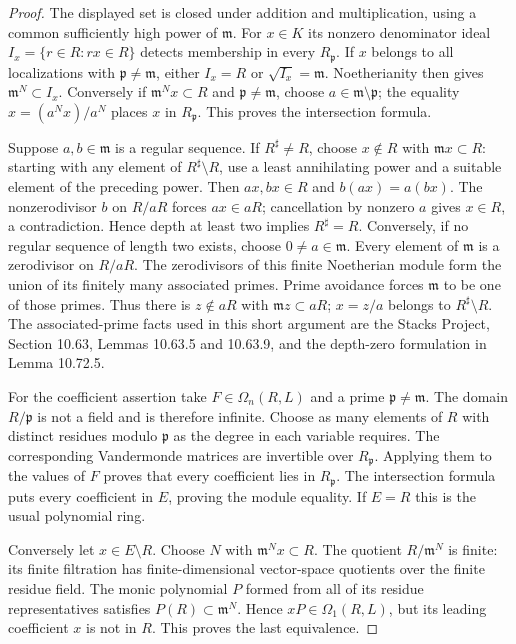 \documentclass[11pt,a4paper]{article}
\theoremstyle{definition}
\begin{document}
\begin{proof}
The displayed set is closed under addition and multiplication,
using a common sufficiently high power of $\mathfrak m$.
For $x\in K$ its nonzero denominator ideal
$I_x=\{r\in R:rx\in R\}$ detects membership in every
$R_{\mathfrak p}$. If $x$ belongs to all localizations with
$\mathfrak p\ne\mathfrak m$, either $I_x=R$ or
$\sqrt{I_x}=\mathfrak m$. Noetherianity then gives
$\mathfrak m^N\subset I_x$. Conversely if
$\mathfrak m^Nx\subset R$ and $\mathfrak p\ne\mathfrak m$,
choose $a\in\mathfrak m\setminus\mathfrak p$; the equality
$x=(a^Nx)/a^N$ places $x$ in $R_{\mathfrak p}$.
This proves the intersection formula.

Suppose $a,b\in\mathfrak m$ is a regular sequence. If
$R^\sharp\ne R$, choose $x\notin R$ with
$\mathfrak m x\subset R$: starting with any element of
$R^\sharp\setminus R$, use a least annihilating power and a
suitable element of the preceding power. Then $ax,bx\in R$ and
$b(ax)=a(bx)$. The nonzerodivisor $b$ on $R/aR$ forces
$ax\in aR$; cancellation by nonzero $a$ gives $x\in R$,
a contradiction. Hence depth at least two implies $R^\sharp=R$.
Conversely, if no regular sequence of length two exists, choose
$0\ne a\in\mathfrak m$. Every element of $\mathfrak m$ is a
zerodivisor on $R/aR$. The zerodivisors of this finite Noetherian
module form the union of its finitely many associated primes.
Prime avoidance forces $\mathfrak m$ to be one of those primes.
Thus there is $z\notin aR$ with $\mathfrak m z\subset aR$;
$x=z/a$ belongs to $R^\sharp\setminus R$.
The associated-prime facts used in this short argument are the
Stacks Project, Section 10.63, Lemmas 10.63.5 and 10.63.9,
and the depth-zero formulation in Lemma 10.72.5.

For the coefficient assertion take $F\in\Omega_n(R,L)$ and a
prime $\mathfrak p\ne\mathfrak m$. The domain $R/\mathfrak p$
is not a field and is therefore infinite. Choose as many elements
of $R$ with distinct residues modulo $\mathfrak p$ as the degree
in each variable requires. The corresponding Vandermonde
matrices are invertible over $R_{\mathfrak p}$. Applying them
to the values of $F$ proves that every coefficient lies in
$R_{\mathfrak p}$. The intersection formula puts every coefficient
in $E$, proving the module equality. If $E=R$ this is the usual
polynomial ring.

Conversely let $x\in E\setminus R$. Choose $N$ with
$\mathfrak m^Nx\subset R$. The quotient $R/\mathfrak m^N$ is
finite: its finite filtration has finite-dimensional vector-space
quotients over the finite residue field. The monic polynomial
$P$ formed from all of its residue representatives satisfies
$P(R)\subset\mathfrak m^N$. Hence $xP\in\Omega_1(R,L)$, but
its leading coefficient $x$ is not in $R$. This proves the last
equivalence.
\end{proof}
\end{document}

